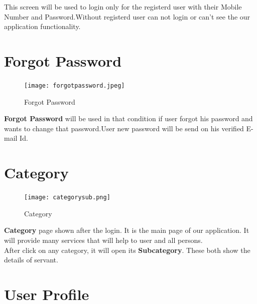 \documentclass[twoside,a4paper,16pt]{book}
\begin{document}
\begin{itemize}
\begin{enumerate}
\begin{enumerate}
 \vspace{0.2cm}

This screen will be used to login only for the registerd user with their Mobile Number and Password.Without registerd user can not login or can't see the our application functionality.




\newpage
\section{Forgot Password}


\vspace{0.6cm}

\begin{figure}[ht!]
\begin{center}
\texttt{[image: forgotpassword.jpeg]}
\caption{Forgot Password}
\end{center}
\end{figure}

 \vspace{0.2cm}

{\bf  Forgot Password}  will be used in that condition if user forgot his password and wants to change that password.User new password will be send on his verified E-mail Id.





\newpage
\section{Category}


\vspace{0.6cm}

\begin{figure}[ht!]
\begin{center}
\texttt{[image: categorysub.png]}
\caption{Category}
\end{center}
\end{figure}

 \vspace{0.2cm}

{\bf Category} page shown after the login. It is the main page of our application. It will provide many services that will help to user and all persons.\\

After click on any category, it will open its {\bf Subcategory}. These both show the details of servant.




\newpage
\section{User Profile}



\end{enumerate}
\end{enumerate}
\end{itemize}
\end{document}
